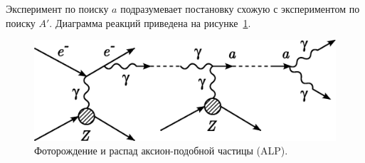 Эксперимент по поиску $a$ подразумевает постановку схожую с экспериментом
по поиску $A'$. Диаграмма реакций приведена на рисунке~\ref{fig:axion-photo}.

\begin{figure}[ht]
    \centering
    \includegraphics[width=0.75\linewidth]{images/illustrative/ALPs-photoprod-ours.eps}
    \caption{Фоторождение и распад аксион-подобной частицы (ALP).}
    \label{fig:axion-photo}
\end{figure}